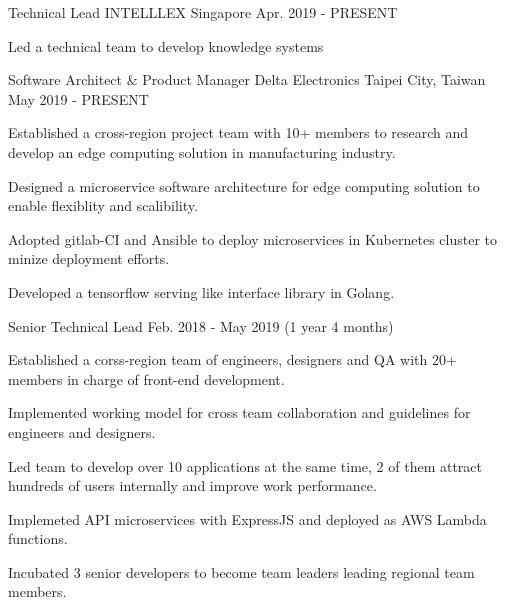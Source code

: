 

\begin{cventries}

  \cventry
    {Technical Lead} %
    {INTELLLEX} %
    {Singapore} %
    {Apr. 2019 - PRESENT} %
    {
      \begin{cvitems} %
        \item {Led a technical team to develop knowledge systems}
      \end{cvitems}
    }

  \cventry
    {Software Architect \& Product Manager} %
    {Delta Electronics} %
    {Taipei City, Taiwan} %
    {May 2019 - PRESENT} %
    {
      \begin{cvitems} %
        \item {Established a cross-region project team with 10+ members to research and develop an edge computing solution in manufacturing industry.}
        \item {Designed a microservice software architecture for edge computing solution to enable flexiblity and scalibility.}
        \item {Adopted gitlab-CI and Ansible to deploy microservices in Kubernetes cluster to minize deployment efforts.}
        \item {Developed a tensorflow serving like interface library in Golang.}
      \end{cvitems}
    }

  \cventry
    {Senior Technical Lead} %
    {} %
    {} %
    {Feb. 2018 - May 2019 (1 year 4 months)} %
    {
      \begin{cvitems} %
        \item {Established a corss-region team of engineers, designers and QA with 20+ members in charge of front-end development.}
        \item {Implemented working model for cross team collaboration and guidelines for engineers and designers.}
        \item {Led team to develop over 10 applications at the same time, 2 of them attract hundreds of users internally and improve work performance.}
        \item {Implemeted API microservices with ExpressJS and deployed as AWS Lambda functions.}
        \item {Incubated 3 senior developers to become team leaders leading regional team members.}
      \end{cvitems}
    }


\end{cventries}
